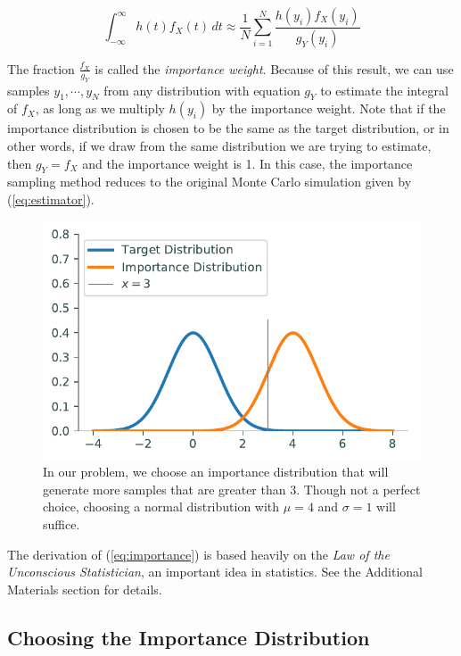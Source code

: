 \begin{equation} \label{eq:importance}
\int_{-\infty}^{\infty} h(t)f_X(t)\,dt \approx \frac{1}{N}\sum_{i = 1}^{N}\frac{h(y_i)f_X(y_i)}{g_Y(y_i)}
\end{equation}

The fraction $\frac{f_X}{g_Y}$ is called the \emph{importance weight}.
Because of this result, we can use samples $y_1, \cdots , y_N$ from any distribution with equation $g_Y$ to estimate the integral of $f_X$, as long as we multiply $h(y_i)$ by the importance weight.
Note that if the importance distribution is chosen to be the same as the target distribution, or in other words, if we draw from the same distribution we are trying to estimate, then $g_Y = f_X$ and the importance weight is 1.
In this case, the importance sampling method reduces to the original Monte Carlo simulation given by (\ref{eq:estimator}).

\begin{figure}[H]
\includegraphics[width=.7\textwidth]{figures/importance_distribution.pdf}
\caption{In our problem, we choose an importance distribution that will generate more samples that are greater than 3. Though not a perfect choice, choosing a normal distribution with $\mu = 4$ and $\sigma = 1$ will suffice.}
\label{fig:importance}
\end{figure}

\begin{info}
The derivation of (\ref{eq:importance}) is based heavily on the \emph{Law of the Unconscious Statistician}, an important idea in statistics.
See the Additional Materials section for details.
\end{info}

\subsection*{Choosing the Importance Distribution} %

